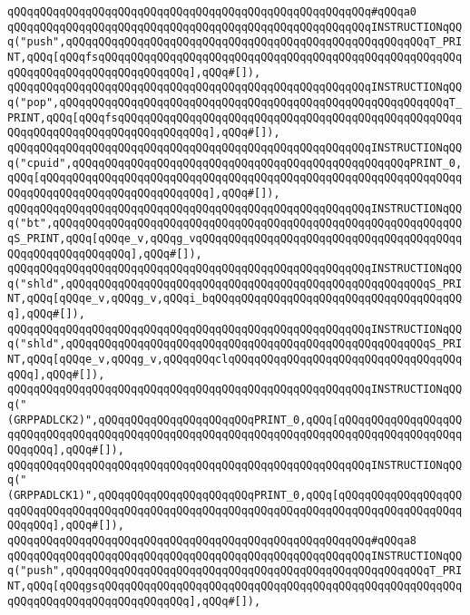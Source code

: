 \verb|qQQqqQQqqQQqqQQqqQQqqQQqqQQqqQQqqQQqqQQqqQQqqQQqqQQqqQQq#qQQqa0|\newline
\verb|qQQqqQQqqQQqqQQqqQQqqQQqqQQqqQQqqQQqqQQqqQQqqQQqqQQqqQQqINSTRUCTIONqQQq("push",qQQqqQQqqQQqqQQqqQQqqQQqqQQqqQQqqQQqqQQqqQQqqQQqqQQqqQQqT_PRINT,qQQq[qQQqfsqQQqqQQqqQQqqQQqqQQqqQQqqQQqqQQqqQQqqQQqqQQqqQQqqQQqqQQqqQQqqQQqqQQqqQQqqQQqqQQqqQQq],qQQq#[]),|\newline
\verb|qQQqqQQqqQQqqQQqqQQqqQQqqQQqqQQqqQQqqQQqqQQqqQQqqQQqqQQqINSTRUCTIONqQQq("pop",qQQqqQQqqQQqqQQqqQQqqQQqqQQqqQQqqQQqqQQqqQQqqQQqqQQqqQQqqQQqT_PRINT,qQQq[qQQqfsqQQqqQQqqQQqqQQqqQQqqQQqqQQqqQQqqQQqqQQqqQQqqQQqqQQqqQQqqQQqqQQqqQQqqQQqqQQqqQQqqQQq],qQQq#[]),|\newline
\verb|qQQqqQQqqQQqqQQqqQQqqQQqqQQqqQQqqQQqqQQqqQQqqQQqqQQqqQQqINSTRUCTIONqQQq("cpuid",qQQqqQQqqQQqqQQqqQQqqQQqqQQqqQQqqQQqqQQqqQQqqQQqqQQqPRINT_0,qQQq[qQQqqQQqqQQqqQQqqQQqqQQqqQQqqQQqqQQqqQQqqQQqqQQqqQQqqQQqqQQqqQQqqQQqqQQqqQQqqQQqqQQqqQQqqQQqqQQq],qQQq#[]),|\newline
\verb|qQQqqQQqqQQqqQQqqQQqqQQqqQQqqQQqqQQqqQQqqQQqqQQqqQQqqQQqINSTRUCTIONqQQq("bt",qQQqqQQqqQQqqQQqqQQqqQQqqQQqqQQqqQQqqQQqqQQqqQQqqQQqqQQqqQQqqQQqS_PRINT,qQQq[qQQqe_v,qQQqg_vqQQqqQQqqQQqqQQqqQQqqQQqqQQqqQQqqQQqqQQqqQQqqQQqqQQqqQQqqQQq],qQQq#[]),|\newline
\verb|qQQqqQQqqQQqqQQqqQQqqQQqqQQqqQQqqQQqqQQqqQQqqQQqqQQqqQQqINSTRUCTIONqQQq("shld",qQQqqQQqqQQqqQQqqQQqqQQqqQQqqQQqqQQqqQQqqQQqqQQqqQQqqQQqS_PRINT,qQQq[qQQqe_v,qQQqg_v,qQQqi_bqQQqqQQqqQQqqQQqqQQqqQQqqQQqqQQqqQQqqQQq],qQQq#[]),|\newline
\verb|qQQqqQQqqQQqqQQqqQQqqQQqqQQqqQQqqQQqqQQqqQQqqQQqqQQqqQQqINSTRUCTIONqQQq("shld",qQQqqQQqqQQqqQQqqQQqqQQqqQQqqQQqqQQqqQQqqQQqqQQqqQQqqQQqS_PRINT,qQQq[qQQqe_v,qQQqg_v,qQQqqQQqclqQQqqQQqqQQqqQQqqQQqqQQqqQQqqQQqqQQqqQQq],qQQq#[]),|\newline
\verb|qQQqqQQqqQQqqQQqqQQqqQQqqQQqqQQqqQQqqQQqqQQqqQQqqQQqqQQqINSTRUCTIONqQQq("(GRPPADLCK2)",qQQqqQQqqQQqqQQqqQQqqQQqPRINT_0,qQQq[qQQqqQQqqQQqqQQqqQQqqQQqqQQqqQQqqQQqqQQqqQQqqQQqqQQqqQQqqQQqqQQqqQQqqQQqqQQqqQQqqQQqqQQqqQQqqQQq],qQQq#[]),|\newline
\verb|qQQqqQQqqQQqqQQqqQQqqQQqqQQqqQQqqQQqqQQqqQQqqQQqqQQqqQQqINSTRUCTIONqQQq("(GRPPADLCK1)",qQQqqQQqqQQqqQQqqQQqqQQqPRINT_0,qQQq[qQQqqQQqqQQqqQQqqQQqqQQqqQQqqQQqqQQqqQQqqQQqqQQqqQQqqQQqqQQqqQQqqQQqqQQqqQQqqQQqqQQqqQQqqQQqqQQq],qQQq#[]),|\newline
\verb|qQQqqQQqqQQqqQQqqQQqqQQqqQQqqQQqqQQqqQQqqQQqqQQqqQQqqQQq#qQQqa8|\newline
\verb|qQQqqQQqqQQqqQQqqQQqqQQqqQQqqQQqqQQqqQQqqQQqqQQqqQQqqQQqINSTRUCTIONqQQq("push",qQQqqQQqqQQqqQQqqQQqqQQqqQQqqQQqqQQqqQQqqQQqqQQqqQQqqQQqT_PRINT,qQQq[qQQqgsqQQqqQQqqQQqqQQqqQQqqQQqqQQqqQQqqQQqqQQqqQQqqQQqqQQqqQQqqQQqqQQqqQQqqQQqqQQqqQQqqQQq],qQQq#[]),|\newline
